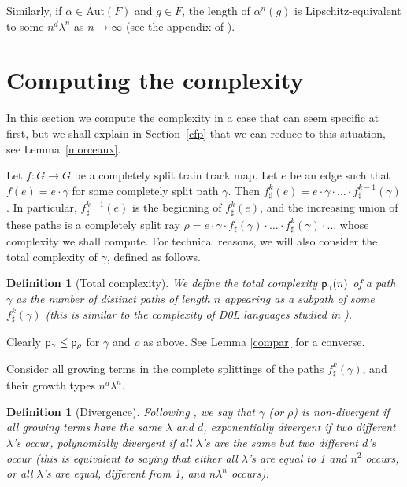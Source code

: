 \documentclass[11pt]{amsart}
\newtheorem{dfn}[thm]{Definition}
\theoremstyle{remark}
\newcommand{\Aut} {{\mathrm{Aut}}}
\newcommand{\cp}{{\sf  p}}
\begin{document}
  Similarly, if $\alpha\in\Aut(F)$ and $g\in F$, the length of $\alpha^n(g)$ is Lipschitz-equivalent to some $n^d \lambda^n$ as $n\to\infty$   (see the appendix of  \cite{counting}).
 
 \section{Computing the complexity} \label{totc}

  In this section we compute the complexity in a case that can seem specific at first, but we shall explain in Section~\ref{cfp} that we can reduce to this situation, see Lemma~\ref{morceaux}.
 
 Let $f:G\to G$ be a completely split train track map. Let $e$ be an edge such that $f(e)=e\cdot\gamma$ for some completely split path $\gamma$. 
  Then $f^k_\sharp(e)=e\cdot \gamma \cdot {\dots} \cdot f^{k-1}_\sharp(\gamma)$.
 In particular, $f^{k-1}_\sharp(e)$ is the beginning of $f^k_\sharp(e)$, and the increasing union of these paths is
  a completely split ray $\rho=e \cdot \gamma \cdot f_\sharp(\gamma)\cdot {\dots} \cdot f^k_\sharp(\gamma)\cdot {\dots}$ whose complexity we shall compute.  
   For technical reasons, we will also consider the total complexity of $\gamma$, defined as follows.
 
 
\begin{dfn}[Total complexity]\label{totcomp}
  We define the \emph{total complexity} $\cp_\gamma(n)$ of a path $\gamma$ as the number of distinct   paths of length $n$ appearing as a subpath of some $f^k_\sharp(\gamma)$   (this is similar to the complexity of D0L languages studied in \cite{Ehrenfeucht-Lee-Rozenberg}).
\end{dfn}



Clearly $\cp_\gamma\le \cp_\rho$ for $\gamma$ and $\rho$ as above. See 
Lemma \ref{compar} for a converse.


 Consider all growing terms in the complete splittings of the paths $f^k_\sharp(\gamma)$, and  their growth   types $n^d\lambda^n $.

\begin{dfn}[Divergence] \label{diver}
 Following \cite{pansiot}, we say that $\gamma$  (or $\rho$) is \emph{non-divergent} if all growing terms have the same $\lambda$ and $d$, \emph{exponentially divergent} if two different $\lambda$'s occur, \emph{polynomially divergent} if all $\lambda$'s are the same but two different $d$'s occur (this is equivalent to saying that either all $\lambda$'s are equal to 1 and  $n^2$ occurs,  or all  $\lambda$'s are equal, different from 1,  and    $n\lambda^n$  occurs). 
 \end{dfn}
\end{document}
